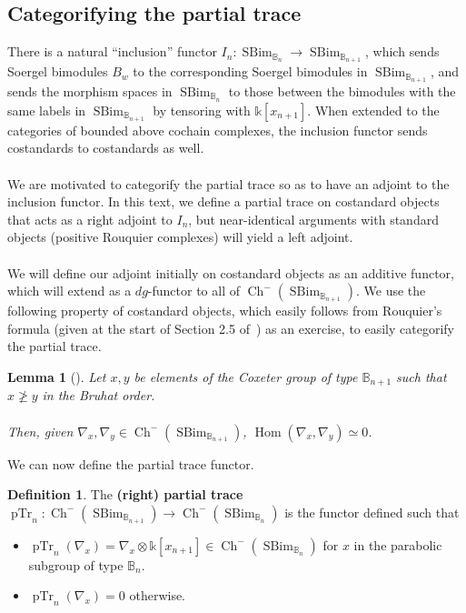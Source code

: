 \documentclass[11pt]{article}
\DeclareMathOperator{\Hom}{Hom}
\DeclareMathOperator{\Ch}{Ch}
\DeclareMathOperator{\SBim}{SBim}
\DeclareMathOperator{\pTr}{pTr}
\newtheorem{lemma}[thm]{Lemma}
\theoremstyle{definition}
\newtheorem{definition}{Definition}[section]
\theoremstyle{remark}
\numberwithin{equation}{section}
\begin{document}
\subsection{Categorifying the partial trace}
There is a natural ``inclusion'' functor $I_n:\SBim_{\mathbb{B}_n}\to \SBim_{\mathbb{B}_{n+1}}$, which
sends Soergel bimodules $B_w$ to the corresponding Soergel bimodules in
$\SBim_{\mathbb{B}_{n+1}}$, and sends the morphism spaces in $\SBim_{\mathbb{B}_n}$ to those
between the bimodules with the same labels in $\SBim_{\mathbb{B}_{n+1}}$ by tensoring with
$\mathbb{k}[x_{n+1}]$. When extended
to the categories of bounded above cochain
complexes, the inclusion functor sends costandards to
costandards as well.
\\ \\
We are motivated to categorify the partial trace so as to have an adjoint to the
inclusion functor. In this text, we define a partial trace on costandard
objects that acts as a right adjoint to $I_n$, but near-identical arguments
with standard objects (positive Rouquier complexes) will yield a left adjoint.
\\ \\
We will define our adjoint initially on costandard objects as an additive functor,
which will extend as a $dg$-functor to all of $\Ch^-(\SBim_{\mathbb{B}_{n+1}})$. We use the
following property of costandard objects, which
easily follows from Rouquier's formula (given at the start of Section 2.5
of~\cite{libedinsky_standard_2014}) as an exercise,
to easily categorify the partial
trace.
\begin{lemma}[\cite{libedinsky_standard_2014}]
	\label{lem:costandardhoms}
	Let $x,y$ be elements of the Coxeter group of type $\mathbb{B}_{n+1}$ such that
	$x \ngeq y$ in the Bruhat order.
	\\\\
	Then,
	given $\nabla_{x},\nabla_y\in \Ch^-(\SBim_{\mathbb{B}_{n+1}})$,
	$\Hom(\nabla_x,\nabla_y)\simeq 0$.
\end{lemma}
We can now define the partial trace functor.
\begin{definition}
	The \textbf{(right) partial trace} $\pTr_n:\Ch^-(\SBim_{\mathbb{B}_{n+1}})\to
	\Ch^-(\SBim_{\mathbb{B}_{n}})$ is the functor defined such that
\begin{itemize}
	\item $\pTr_n(\nabla_x)=\nabla_x\otimes \mathbb{k}[x_{n+1}]\in
		\Ch^-(\SBim_{\mathbb{B}_n})$ for $x$ in the parabolic subgroup of
		type $\mathbb{B}_n$.
	\item $\pTr_n(\nabla_x)=0$ otherwise.
\end{itemize}
\end{definition}
\end{document}
